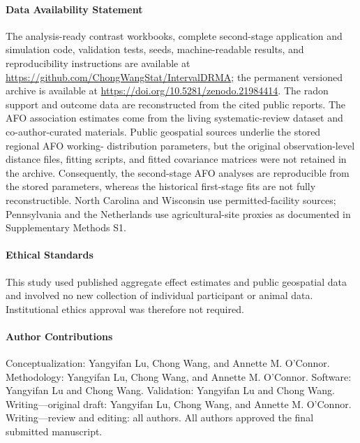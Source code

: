 \documentclass[journal=rsm]{CUP-JNL-DTM}%
\theoremstyle{definition}
\numberwithin{equation}{section}
\begin{document}
\begin{Backmatter}
\paragraph{Data Availability Statement}
The analysis-ready contrast workbooks, complete second-stage application and
simulation code, validation tests, seeds, machine-readable results, and
reproducibility instructions are available at
\url{https://github.com/ChongWangStat/IntervalDRMA}; the permanent versioned
archive is available at \url{https://doi.org/10.5281/zenodo.21984414}. The radon support and outcome
data are reconstructed from the cited public reports. The AFO association
estimates come from the living systematic-review dataset and co-author-curated
materials. Public geospatial sources underlie the stored regional AFO working-
distribution parameters, but the original observation-level distance files,
fitting scripts, and fitted covariance matrices were not retained in the
archive. Consequently, the second-stage AFO analyses are reproducible from the
stored parameters, whereas the historical first-stage fits are not fully
reconstructible. North Carolina and Wisconsin use permitted-facility sources;
Pennsylvania and the Netherlands use agricultural-site proxies as documented
in Supplementary Methods S1.

\paragraph{Ethical Standards}
This study used published aggregate effect estimates and public geospatial data and involved no new collection of individual participant or animal data. Institutional ethics approval was therefore not required.

\paragraph{Author Contributions}
Conceptualization: Yangyifan Lu, Chong Wang, and Annette M. O'Connor. Methodology: Yangyifan Lu, Chong Wang, and Annette M. O'Connor. Software: Yangyifan Lu and Chong Wang. Validation: Yangyifan Lu and Chong Wang. Writing---original draft: Yangyifan Lu, Chong Wang, and Annette M. O'Connor. Writing---review and editing: all authors. All authors approved the final submitted manuscript.



%
\printbibliography

\end{Backmatter}
\end{document}
